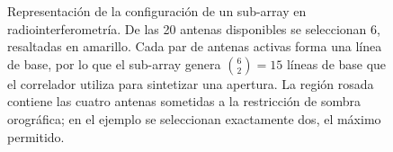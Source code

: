 \begin{figure}[htbp]
\caption{Representación de la configuración de un sub-array en radiointerferometría. De las 20 antenas disponibles se seleccionan 6, resaltadas en amarillo. Cada par de antenas activas forma una línea de base, por lo que el sub-array genera $\binom{6}{2}=15$ líneas de base que el correlador utiliza para sintetizar una apertura. La región rosada contiene las cuatro antenas sometidas a la restricción de sombra orográfica; en el ejemplo se seleccionan exactamente dos, el máximo permitido.}
\end{figure}